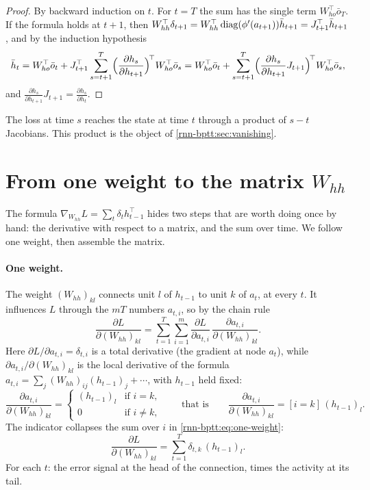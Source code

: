 \begin{notechapter}
\begin{proof}
By backward induction on $t$. For $t = T$ the sum has the single term $W_{ho}^\top\bar o_T$. If the formula holds at $t+1$,
then $W_{hh}^\top\delta_{t+1} = W_{hh}^\top\operatorname{diag}(\phi'(a_{t+1}))\bar h_{t+1} = J_{t+1}^\top\bar h_{t+1}$, and by the induction hypothesis
\[
  \bar h_t = W_{ho}^\top\bar o_t + J_{t+1}^\top\sum_{s=t+1}^T\Bigl(\frac{\partial h_s}{\partial h_{t+1}}\Bigr)^{\!\top}W_{ho}^\top\bar o_s
  = W_{ho}^\top\bar o_t + \sum_{s=t+1}^T\Bigl(\frac{\partial h_s}{\partial h_{t+1}}J_{t+1}\Bigr)^{\!\top}W_{ho}^\top\bar o_s ,
\]
and $\frac{\partial h_s}{\partial h_{t+1}}J_{t+1} = \frac{\partial h_s}{\partial h_t}$.
\end{proof}

The loss at time $s$ reaches the state at time $t$ through a product of $s - t$ Jacobians. This
product is the object of \cref{rnn-bptt:sec:vanishing}.

\section{From one weight to the matrix \texorpdfstring{$W_{hh}$}{W\_hh}}\label{rnn-bptt:sec:weight}

The formula $\nabla_{W_{hh}}L = \sum_t\delta_th_{t-1}^\top$ hides two steps that are worth doing once by hand: the
derivative with respect to a matrix, and the sum over time. We follow one weight, then
assemble the matrix.

\paragraph{One weight.} The weight $(W_{hh})_{kl}$ connects unit $l$ of $h_{t-1}$ to unit $k$ of $a_t$, at every $t$. It
influences $L$ through the $mT$ numbers $a_{t,i}$, so by the chain rule
\begin{equation}\label{rnn-bptt:eq:one-weight}
  \frac{\partial L}{\partial(W_{hh})_{kl}} = \sum_{t=1}^T\sum_{i=1}^m\frac{\partial L}{\partial a_{t,i}}\,
  \frac{\partial a_{t,i}}{\partial(W_{hh})_{kl}} .
\end{equation}
Here $\partial L/\partial a_{t,i} = \delta_{t,i}$ is a total derivative (the gradient at node $a_t$), while
$\partial a_{t,i}/\partial(W_{hh})_{kl}$ is the local derivative of the formula
$a_{t,i} = \sum_j(W_{hh})_{ij}(h_{t-1})_j + \cdots$, with $h_{t-1}$ held fixed:
\[
  \frac{\partial a_{t,i}}{\partial(W_{hh})_{kl}} = \begin{cases}(h_{t-1})_l & \text{if } i = k,\\ 0 & \text{if } i\neq k,\end{cases}
  \qquad\text{that is}\qquad \frac{\partial a_{t,i}}{\partial(W_{hh})_{kl}} = [i = k]\,(h_{t-1})_l .
\]
The indicator collapses the sum over $i$ in \cref{rnn-bptt:eq:one-weight}:
\begin{equation}\label{rnn-bptt:eq:entry}
  \frac{\partial L}{\partial(W_{hh})_{kl}} = \sum_{t=1}^T\delta_{t,k}\,(h_{t-1})_l .
\end{equation}
For each $t$: the error signal at the head of the connection, times the activity at its tail.


\end{notechapter}

